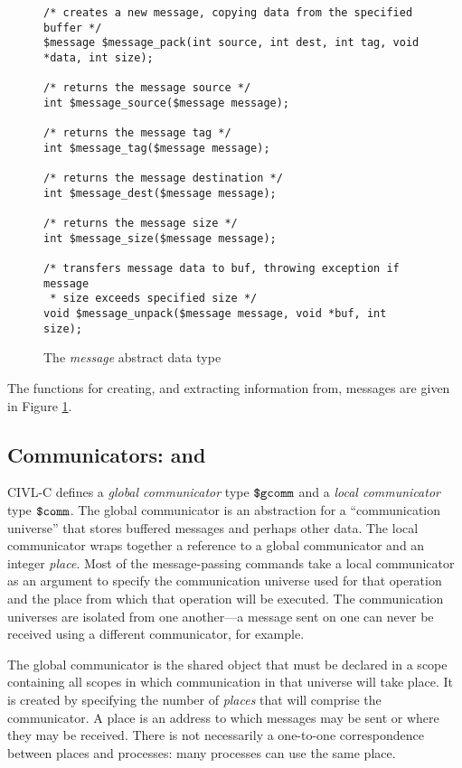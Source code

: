 \begin{figure}
  \begin{small}
\begin{verbatim}
/* creates a new message, copying data from the specified buffer */ 
$message $message_pack(int source, int dest, int tag, void *data, int size);

/* returns the message source */ 
int $message_source($message message);

/* returns the message tag */
int $message_tag($message message);

/* returns the message destination */ 
int $message_dest($message message);

/* returns the message size */ 
int $message_size($message message);

/* transfers message data to buf, throwing exception if message
 * size exceeds specified size */ 
void $message_unpack($message message, void *buf, int size);
\end{verbatim}
  \end{small}
  \caption{The \emph{message} abstract data type}
  \label{fig:message}
\end{figure}

The functions for creating, and extracting information from, messages
are given in Figure \ref{fig:message}.

\subsection{Communicators: \cgcomm{} and \ccomm}
\label{sec:communicators}

CIVL-C defines a \emph{global communicator} type $\mbox{\texttt{\${}gcomm}}$ and a
\emph{local communicator} type $\mbox{\texttt{\${}comm}}$. The global communicator is an
abstraction for a ``communication universe'' that stores buffered
messages and perhaps other data.  The local communicator wraps
together a reference to a global communicator and an integer
\emph{place}.  Most of the message-passing commands take a local
communicator as an argument to specify the communication universe used
for that operation and the place from which that operation will be
executed.  The communication universes are isolated from one
another---a message sent on one can never be received using a
different communicator, for example.

The global communicator is the shared object that must be declared in
a scope containing all scopes in which communication in that universe
will take place. It is created by specifying the number of
\emph{places} that will comprise the communicator. A place is an
address to which messages may be sent or where they may be received.
There is not necessarily a one-to-one correspondence between places and
processes: many processes can use the same place.

